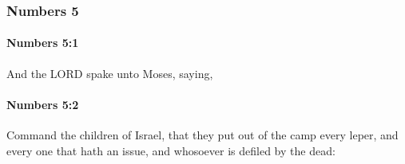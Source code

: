	\subsubsection{Numbers 5} %
		\label{NUMBERS-5}

		\paragraph{Numbers 5:1} %
			\label{NUMBERS-5-1}

			And the LORD spake unto Moses, saying,


		\paragraph{Numbers 5:2} %
			\label{NUMBERS-5-2}

			Command the children of Israel, that they put out of the camp every leper, and every one that hath an issue, and whosoever is defiled by the dead:

